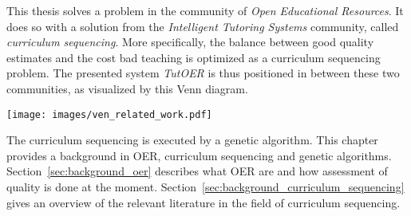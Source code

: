 This thesis solves a problem in the community of \emph{Open Educational
Resources}. It does so with a solution from the \emph{Intelligent Tutoring
Systems} community, called \emph{curriculum sequencing}. More specifically,
the balance between good quality estimates and the cost bad teaching is
optimized as a curriculum sequencing problem. The presented system
\emph{TutOER} is thus positioned in between these two communities, as
visualized by this Venn diagram.\\
\begin{center}
\texttt{[image: images/ven\_related\_work.pdf]}
\end{center}
\noindent
The curriculum sequencing is executed by a genetic algorithm. This chapter
provides a background in OER, curriculum sequencing and genetic algorithms.
Section~\ref{sec:background_oer} describes what OER are and how assessment of
quality is done at the moment.
Section~\ref{sec:background_curriculum_sequencing} gives an overview of the
relevant literature in the field of curriculum sequencing.

